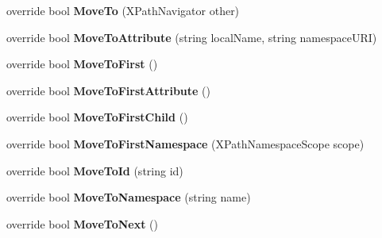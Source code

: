 \begin{DoxyCompactItemize}
override bool {\bfseries Move\+To} (X\+Path\+Navigator other)
\item 
\mbox{\label{class_html_agility_pack_1_1_html_node_navigator_a6b7fc67311c2ac265885e54c5635541f}} 
override bool {\bfseries Move\+To\+Attribute} (string local\+Name, string namespace\+U\+RI)
\item 
\mbox{\label{class_html_agility_pack_1_1_html_node_navigator_a526c05386cfddeaa487a0faec47b7249}} 
override bool {\bfseries Move\+To\+First} ()
\item 
\mbox{\label{class_html_agility_pack_1_1_html_node_navigator_a6ccb3234a1eb952d67f616228d27dd12}} 
override bool {\bfseries Move\+To\+First\+Attribute} ()
\item 
\mbox{\label{class_html_agility_pack_1_1_html_node_navigator_a4ca4c49ada01e73a3ad6a5344d73e6f2}} 
override bool {\bfseries Move\+To\+First\+Child} ()
\item 
\mbox{\label{class_html_agility_pack_1_1_html_node_navigator_aa2e0f478c95ac0b68f0f4c0143a999a7}} 
override bool {\bfseries Move\+To\+First\+Namespace} (X\+Path\+Namespace\+Scope scope)
\item 
\mbox{\label{class_html_agility_pack_1_1_html_node_navigator_a5b647847ecfcedf5701785b1d8263155}} 
override bool {\bfseries Move\+To\+Id} (string id)
\item 
\mbox{\label{class_html_agility_pack_1_1_html_node_navigator_ab7a996c7b03fba88e8c3be79e89bb4aa}} 
override bool {\bfseries Move\+To\+Namespace} (string name)
\item 
\mbox{\label{class_html_agility_pack_1_1_html_node_navigator_a79cba8a157ccdf5e84059f1c0b65478f}} 
override bool {\bfseries Move\+To\+Next} ()
\item 
\mbox{\label{class_html_agility_pack_1_1_html_node_navigator_a049a7cf5bfa4a0d2af2cf41a997edc21}} 

\end{DoxyCompactItemize}
